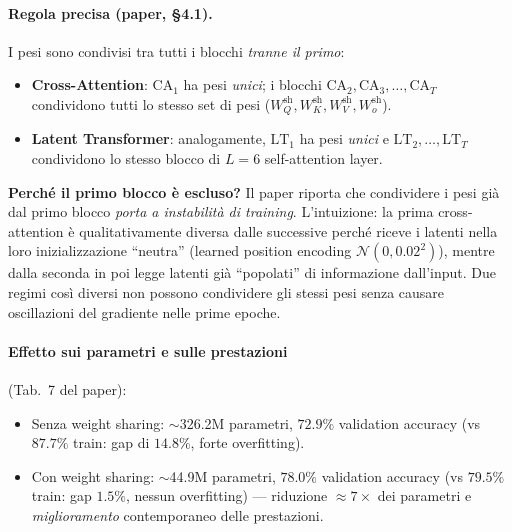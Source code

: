 \documentclass[
  11pt,
]{article}
\begin{document}
\begin{center}
\end{center}

\paragraph{Regola precisa (paper, \S4.1).} I pesi sono condivisi tra tutti i blocchi \emph{tranne il primo}:
\begin{itemize}
\item \textbf{Cross-Attention}: $\text{CA}_1$ ha pesi \emph{unici}; i blocchi $\text{CA}_2, \text{CA}_3, \ldots, \text{CA}_T$ condividono tutti lo stesso set di pesi ($W_Q^{\text{sh}}, W_K^{\text{sh}}, W_V^{\text{sh}}, W_o^{\text{sh}}$).
\item \textbf{Latent Transformer}: analogamente, $\text{LT}_1$ ha pesi \emph{unici} e $\text{LT}_2, \ldots, \text{LT}_T$ condividono lo stesso blocco di $L = 6$ self-attention layer.
\end{itemize}

\textbf{Perché il primo blocco è escluso?} Il paper riporta che condividere i pesi già dal primo blocco \emph{porta a instabilità di training}. L'intuizione: la prima cross-attention è qualitativamente diversa dalle successive perché riceve i latenti nella loro inizializzazione ``neutra'' (learned position encoding $\mathcal{N}(0, 0.02^2)$), mentre dalla seconda in poi legge latenti già ``popolati'' di informazione dall'input. Due regimi così diversi non possono condividere gli stessi pesi senza causare oscillazioni del gradiente nelle prime epoche.

\paragraph{Effetto sui parametri e sulle prestazioni} (Tab.\ 7 del paper):
\begin{itemize}
\item Senza weight sharing: $\sim$326.2M parametri, $72.9\%$ validation accuracy (vs $87.7\%$ train: gap di $14.8\%$, forte overfitting).
\item Con weight sharing: $\sim$44.9M parametri, \textbf{$78.0\%$} validation accuracy (vs $79.5\%$ train: gap $1.5\%$, nessun overfitting) --- riduzione $\approx 7\times$ dei parametri e \emph{miglioramento} contemporaneo delle prestazioni.
\end{itemize}
\end{document}
